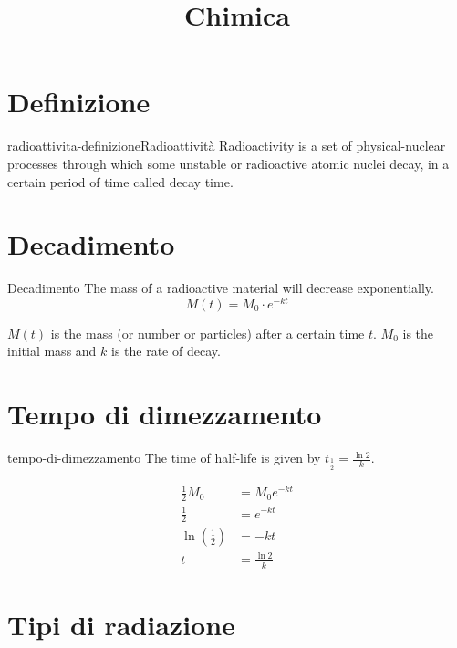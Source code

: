 \documentclass[preview]{standalone}
\begin{document}
\title{Chimica}
\genpage

\section{Definizione}

\begin{snippetdefinition}{radioattivita-definizione}{Radioattività}
    Radioactivity is a set of physical-nuclear processes
through which some unstable or radioactive atomic nuclei decay,
in a certain period of time called decay time.
\end{snippetdefinition}


\section{Decadimento}

\begin{snippet}{Decadimento}
    The mass of a radioactive material will decrease exponentially.
    \[
        M(t) = M_0 \cdot e^{-kt}
    \]

    \(M(t)\) is the mass (or number or particles)
    after a certain time \(t\). \(M_0\) is the initial mass
    and \(k\) is the rate of decay.
\end{snippet}

\section{Tempo di dimezzamento}

\begin{snippet}{tempo-di-dimezzamento}
    The time of half-life is given by \(t_\frac{1}{2} = \frac{\ln 2}{k}\).

    \begin{align*}
        \frac{1}{2}M_0 &= M_0 e^{-kt} \\
        \frac{1}{2} &= e^{-kt} \\
        \ln\left(\frac{1}{2}\right) &= -kt \\
        t &= \frac{\ln 2}{k}
    \end{align*}
\end{snippet}

\section{Tipi di radiazione}
\end{document}
